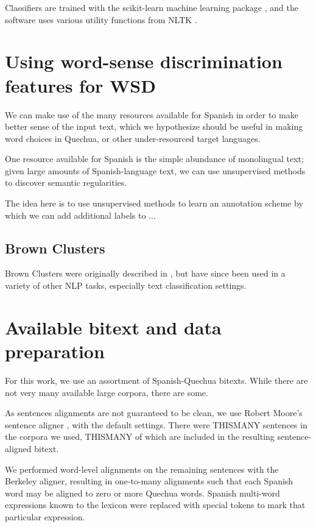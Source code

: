\documentclass[10pt, a4paper]{article}
\begin{document}
Classifiers are trained with the scikit-learn machine learning package
\cite{scikit-learn}, and the software uses various utility functions from NLTK
\cite{nltkbook}.


\section{Using word-sense discrimination features for WSD}

We can make use of the many resources available for Spanish in order to make
better sense of the input text, which we hypothesize should be useful in making
word choices in Quechua, or other under-resourced target languages.

One resource available for Spanish is the simple abundance of monolingual text;
given large amounts of Spanish-language text, we can use unsupervised methods
to discover semantic regularities.


The idea here is to use unsupervised methods to learn an annotation scheme by
which we can add additional labels to ...


\subsection{Brown Clusters}
Brown Clusters were originally described in \cite{Brown92class-basedn-gram},
but have since been used in a variety of other NLP tasks, especially text
classification settings.


\section{Available bitext and data preparation}
For this work, we use an assortment of Spanish-Quechua bitexts.
While there are not very many available large corpora, there are some.

As sentences alignments are not guaranteed to be clean, we use Robert Moore's
sentence aligner \cite{DBLP:conf/amta/Moore02}, with the default settings.
There were THISMANY sentences in the corpora we used, THISMANY of which are
included in the resulting sentence-aligned bitext.

We performed word-level alignments on the remaining sentences with the Berkeley
aligner, resulting in one-to-many alignments such that each Spanish word may be
aligned to zero or more Quechua words. Spanish multi-word expressions known to
the lexicon were replaced with special tokens to mark that particular
expression.
\end{document}
